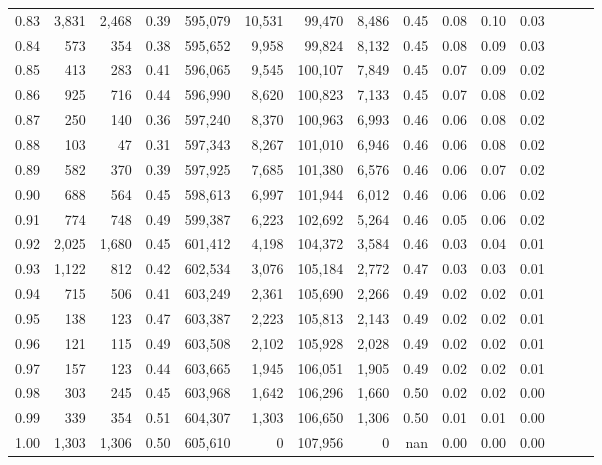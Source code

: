 \begin{tabular}{rrrrrrrrrrrrrrr}
0.83 &   3,831 &  2,468 &  0.39 &  595,079 &   10,531 &   99,470 &    8,486 &  0.45 &  0.08 &  0.10 &      0.03 \\
0.84 &     573 &    354 &  0.38 &  595,652 &    9,958 &   99,824 &    8,132 &  0.45 &  0.08 &  0.09 &      0.03 \\
0.85 &     413 &    283 &  0.41 &  596,065 &    9,545 &  100,107 &    7,849 &  0.45 &  0.07 &  0.09 &      0.02 \\
0.86 &     925 &    716 &  0.44 &  596,990 &    8,620 &  100,823 &    7,133 &  0.45 &  0.07 &  0.08 &      0.02 \\
0.87 &     250 &    140 &  0.36 &  597,240 &    8,370 &  100,963 &    6,993 &  0.46 &  0.06 &  0.08 &      0.02 \\
0.88 &     103 &     47 &  0.31 &  597,343 &    8,267 &  101,010 &    6,946 &  0.46 &  0.06 &  0.08 &      0.02 \\
0.89 &     582 &    370 &  0.39 &  597,925 &    7,685 &  101,380 &    6,576 &  0.46 &  0.06 &  0.07 &      0.02 \\
0.90 &     688 &    564 &  0.45 &  598,613 &    6,997 &  101,944 &    6,012 &  0.46 &  0.06 &  0.06 &      0.02 \\
0.91 &     774 &    748 &  0.49 &  599,387 &    6,223 &  102,692 &    5,264 &  0.46 &  0.05 &  0.06 &      0.02 \\
0.92 &   2,025 &  1,680 &  0.45 &  601,412 &    4,198 &  104,372 &    3,584 &  0.46 &  0.03 &  0.04 &      0.01 \\
0.93 &   1,122 &    812 &  0.42 &  602,534 &    3,076 &  105,184 &    2,772 &  0.47 &  0.03 &  0.03 &      0.01 \\
0.94 &     715 &    506 &  0.41 &  603,249 &    2,361 &  105,690 &    2,266 &  0.49 &  0.02 &  0.02 &      0.01 \\
0.95 &     138 &    123 &  0.47 &  603,387 &    2,223 &  105,813 &    2,143 &  0.49 &  0.02 &  0.02 &      0.01 \\
0.96 &     121 &    115 &  0.49 &  603,508 &    2,102 &  105,928 &    2,028 &  0.49 &  0.02 &  0.02 &      0.01 \\
0.97 &     157 &    123 &  0.44 &  603,665 &    1,945 &  106,051 &    1,905 &  0.49 &  0.02 &  0.02 &      0.01 \\
0.98 &     303 &    245 &  0.45 &  603,968 &    1,642 &  106,296 &    1,660 &  0.50 &  0.02 &  0.02 &      0.00 \\
0.99 &     339 &    354 &  0.51 &  604,307 &    1,303 &  106,650 &    1,306 &  0.50 &  0.01 &  0.01 &      0.00 \\
1.00 &   1,303 &  1,306 &  0.50 &  605,610 &        0 &  107,956 &        0 &   nan &  0.00 &  0.00 &      0.00 \\
\bottomrule
\end{tabular}
